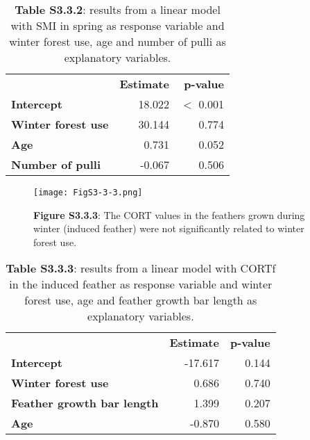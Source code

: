 \documentclass[10pt, twoside]{book} %
\begin{document}
\begin{table}[h!]
	\begin{center}
		\begin{footnotesize}
			\caption*{\textbf{Table S3.3.2}: results from a linear model with SMI in spring as response variable and winter forest use, age and number of pulli as explanatory variables.}
			
			\begingroup
			\setlength{\tabcolsep}{8pt} %
			\renewcommand{\arraystretch}{1.5} %
			\begin{tabular}{p{4cm} r r}
				
				\toprule
				& \textbf{Estimate} & \textbf{p-value}\\
				\cmidrule{2-3}
				\textbf{Intercept} & 18.022 & $<$ 0.001\\
				\textbf{Winter forest use} & 30.144	&0.774\\
				\textbf{Age} & 0.731 & 0.052\\
				\textbf{Number of pulli} & -0.067 & 0.506\\
				\bottomrule
			\end{tabular}\endgroup
		\end{footnotesize}
	\end{center}
\end{table}


\begin{figure}[t]
	\begin{center}
		\texttt{[image: FigS3-3-3.png]}
	\end{center}
	\caption*{\textbf{Figure S3.3.3}: The CORT values in the feathers grown during winter (induced feather) were not significantly related to winter forest use.}
\end{figure}

\begin{table}[h!]
	\begin{center}
		\begin{footnotesize}
			\caption*{\textbf{Table S3.3.3}: results from a linear model with CORTf in the induced feather as response variable and winter forest use, age and feather growth bar length as explanatory variables.}
			
			\begingroup
			\setlength{\tabcolsep}{8pt} %
			\renewcommand{\arraystretch}{1.5} %
			\begin{tabular}{p{4cm} r r}
				
				\toprule
				& \textbf{Estimate} & \textbf{p-value}\\
				\cmidrule{2-3}
				\textbf{Intercept} & -17.617 & 0.144\\
				\textbf{Winter forest use} & 0.686 & 0.740\\
				\textbf{Feather growth bar length} & 1.399 & 0.207\\
				\textbf{Age} & -0.870 & 0.580\\
				\bottomrule
			\end{tabular}\endgroup
		\end{footnotesize}
	\end{center}
\end{table}
\end{document}
